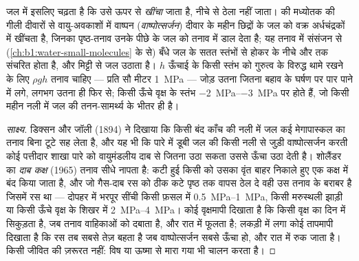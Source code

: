 \begin{theorem}[संसंजन--तनाव क्रियाविधि]\label{thm:b1:plant-transport:cohesiontension}
जल  में इसलिए चढ़ता है कि उसे ऊपर से \emph{खींचा} जाता है, नीचे से
ठेला नहीं जाता।  की मध्योतक  की गीली दीवारों से वायु-अवकाशों
में वाष्पन (\emph{वाष्पोत्सर्जन}) दीवार के महीन छिद्रों के जल को वक्र
अर्धचंद्रकों में खींचता है, जिनका पृष्ठ-तनाव उनके पीछे के जल को तनाव में
डाल देता है; यह तनाव  में संसंजन से (\cref{ch:b1:water-small-molecules}
के  से) बँधे जल के सतत स्तंभों से होकर  के नीचे और
 तक संचरित होता है, और मिट्टी से जल उठाता है। $h$ ऊँचाई के किसी
स्तंभ को गुरुत्व के विरुद्ध थामे रखने के लिए $\rho g h$ तनाव चाहिए ---
प्रति सौ मीटर \qty{1}{MPa} --- जोड़ उतना जितना बहाव के घर्षण पर पार पाने
में लगे, लगभग उतना ही फिर से; किसी ऊँचे वृक्ष के स्तंभ
\qtyrange{-2}{-3}{MPa} पर होते हैं, जो किसी महीन नली में जल की तनन-सामर्थ्य
के भीतर ही है।
\end{theorem}
\begin{proof}[साक्ष्य]
डिक्सन और जॉली (1894) ने दिखाया कि किसी बंद काँच की नली में जल कई
मेगापास्कल का तनाव बिना टूटे सह लेता है, और यह भी कि पारे में डूबी जल की
किसी नली से जुड़ी वाष्पोत्सर्जन करती कोई पत्तीदार शाखा पारे को वायुमंडलीय
दाब से जितना उठा सकता उससे ऊँचा उठा देती है। शोलैंडर का \emph{दाब कक्ष}
(1965) तनाव सीधे नापता है: कटी हुई किसी  को उसका वृंत बाहर निकाले
हुए एक कक्ष में बंद किया जाता है, और जो गैस-दाब रस को ठीक कटे पृष्ठ तक
वापस ठेल दे वही उस तनाव के बराबर है जिसमें रस था --- दोपहर में
भरपूर सींची किसी फ़सल में \qtyrange{0.5}{1}{MPa}, किसी मरुस्थली झाड़ी या
किसी ऊँचे वृक्ष के शिखर में \qtyrange{2}{4}{MPa}। कोई वृक्षमापी दिखाता है
कि किसी वृक्ष का  दिन में सिकुड़ता है, जब तनाव वाहिकाओं को दबाता है,
और रात में फूलता है; लकड़ी में लगा कोई तापमापी दिखाता है कि रस तब सबसे
तेज़ बहता है जब वाष्पोत्सर्जन सबसे ऊँचा हो, और रात में रुक जाता है। किसी
जीवित  की ज़रूरत नहीं: विष या ऊष्मा से मारा गया  भी चालन करता
है।
\end{proof}


